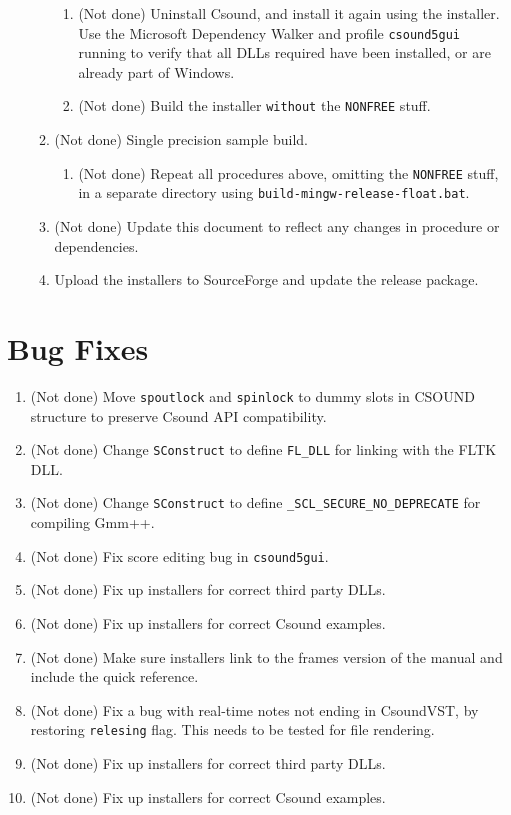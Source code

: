 \documentclass[11pt,letterpaper,onecolumn]{scrartcl}
\begin{document}
\begin{sloppypar}
\begin{enumerate}
\begin{enumerate}
\begin{enumerate}
			    \item (Not done) Uninstall Csound, and install it again using the installer. Use the Microsoft Dependency Walker and profile \texttt{csound5gui} running to verify that all DLLs required have been installed, or are already part of Windows.
			    \item (Not done) Build the installer \texttt{without} the \verb|NONFREE| stuff.   
				\end{enumerate}
			\item (Not done) Single precision sample build.			
				\begin{enumerate}
					\item (Not done) Repeat all procedures above, omitting the \verb|NONFREE| stuff, in a separate directory using \texttt{build-mingw-release-float.bat}. 
				\end{enumerate}
	    \item (Not done) Update this document to reflect any changes in procedure or dependencies. 
	    \item Upload the installers to SourceForge and update the release package.
		\end{enumerate}
 \end{enumerate}

\section{Bug Fixes}
\label{sec:BugFixes}

\begin{enumerate}
	\item (Not done) Move \texttt{spoutlock} and \texttt{spinlock} to dummy slots in CSOUND structure to preserve Csound API compatibility.
	\item (Not done) Change \texttt{SConstruct} to define \verb|FL_DLL| for linking with the FLTK DLL.
	\item (Not done) Change \texttt{SConstruct} to define \verb|_SCL_SECURE_NO_DEPRECATE| for compiling Gmm++.
	\item (Not done) Fix score editing bug in \texttt{csound5gui}.
	\item (Not done) Fix up installers for correct third party DLLs.
	\item (Not done) Fix up installers for correct Csound examples.
	\item (Not done) Make sure installers link to the frames version of the manual and include the quick reference.
	\item (Not done) Fix a bug with real-time notes not ending in CsoundVST, by restoring \texttt{relesing} flag. This needs to be tested for file rendering.
	\item (Not done) Fix up installers for correct third party DLLs.
	\item (Not done) Fix up installers for correct Csound examples.
\end{enumerate}


\end{sloppypar}
\end{document}

